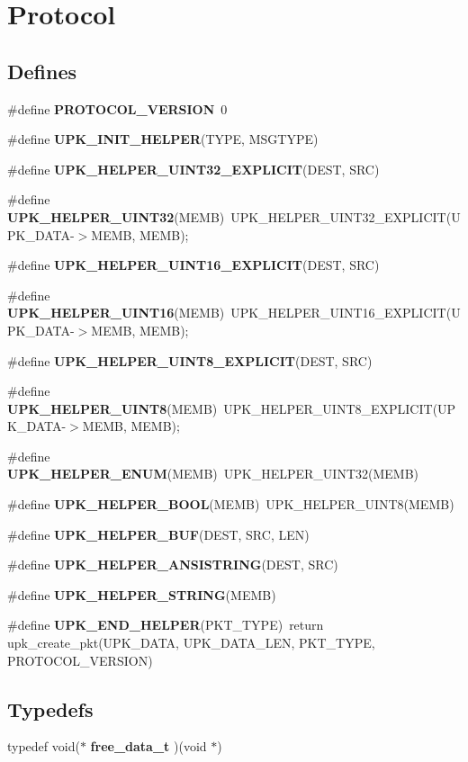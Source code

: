 \section{Protocol}
\label{group__protocol}
\subsection*{Defines}
\begin{DoxyCompactItemize}
\item 
\#define {\bf PROTOCOL\_\-VERSION}~0
\item 
\#define {\bf UPK\_\-INIT\_\-HELPER}(TYPE, MSGTYPE)
\item 
\#define {\bf UPK\_\-HELPER\_\-UINT32\_\-EXPLICIT}(DEST, SRC)
\item 
\#define {\bf UPK\_\-HELPER\_\-UINT32}(MEMB)~UPK\_\-HELPER\_\-UINT32\_\-EXPLICIT(UPK\_\-DATA-\/$>$MEMB, MEMB);
\item 
\#define {\bf UPK\_\-HELPER\_\-UINT16\_\-EXPLICIT}(DEST, SRC)
\item 
\#define {\bf UPK\_\-HELPER\_\-UINT16}(MEMB)~UPK\_\-HELPER\_\-UINT16\_\-EXPLICIT(UPK\_\-DATA-\/$>$MEMB, MEMB);
\item 
\#define {\bf UPK\_\-HELPER\_\-UINT8\_\-EXPLICIT}(DEST, SRC)
\item 
\#define {\bf UPK\_\-HELPER\_\-UINT8}(MEMB)~UPK\_\-HELPER\_\-UINT8\_\-EXPLICIT(UPK\_\-DATA-\/$>$MEMB, MEMB);
\item 
\#define {\bf UPK\_\-HELPER\_\-ENUM}(MEMB)~UPK\_\-HELPER\_\-UINT32(MEMB)
\item 
\#define {\bf UPK\_\-HELPER\_\-BOOL}(MEMB)~UPK\_\-HELPER\_\-UINT8(MEMB)
\item 
\#define {\bf UPK\_\-HELPER\_\-BUF}(DEST, SRC, LEN)
\item 
\#define {\bf UPK\_\-HELPER\_\-ANSISTRING}(DEST, SRC)
\item 
\#define {\bf UPK\_\-HELPER\_\-STRING}(MEMB)
\item 
\#define {\bf UPK\_\-END\_\-HELPER}(PKT\_\-TYPE)~return upk\_\-create\_\-pkt(UPK\_\-DATA, UPK\_\-DATA\_\-LEN, PKT\_\-TYPE, PROTOCOL\_\-VERSION)
\end{DoxyCompactItemize}
\subsection*{Typedefs}
\begin{DoxyCompactItemize}
\item 
typedef void($\ast$ {\bf free\_\-data\_\-t} )(void $\ast$)
\end{DoxyCompactItemize}
